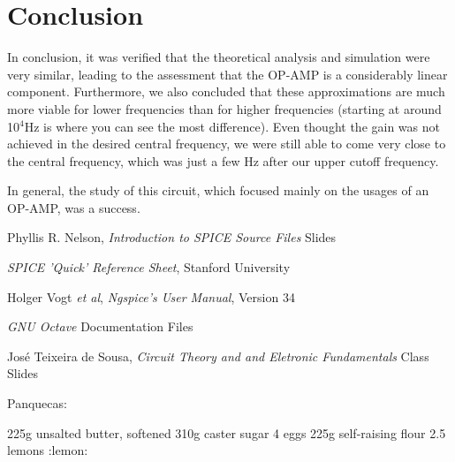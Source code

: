 \clearpage
\section{Conclusion}
\label{sec:conclusion}

In conclusion, it was verified that the theoretical analysis and simulation were very similar, leading to the assessment that the OP-AMP is a considerably linear component. Furthermore, we also concluded that these approximations are much more viable for lower frequencies than for higher frequencies (starting at around 10$^4$Hz is where you can see the most difference).
Even thought the gain was not achieved in the desired central frequency, we were still able to come very close to the central frequency, which was just a few Hz after our upper cutoff frequency.

In general, the study of this circuit, which focused mainly on the usages of an OP-AMP, was a success.

\begin{thebibliography}{}

Phyllis R. Nelson, \emph{Introduction to SPICE Source Files} Slides

\emph{SPICE 'Quick' Reference Sheet}, Stanford University

Holger Vogt \textit{et al}, \emph{Ngspice's User Manual}, Version 34

\emph{GNU Octave} Documentation Files 

José Teixeira de Sousa, \emph{Circuit Theory and and Eletronic Fundamentals} Class Slides

\end{thebibliography}

Panquecas:
\par
225g unsalted butter, softened 310g caster sugar 4 eggs 225g self-raising flour 2.5 lemons :lemon: 